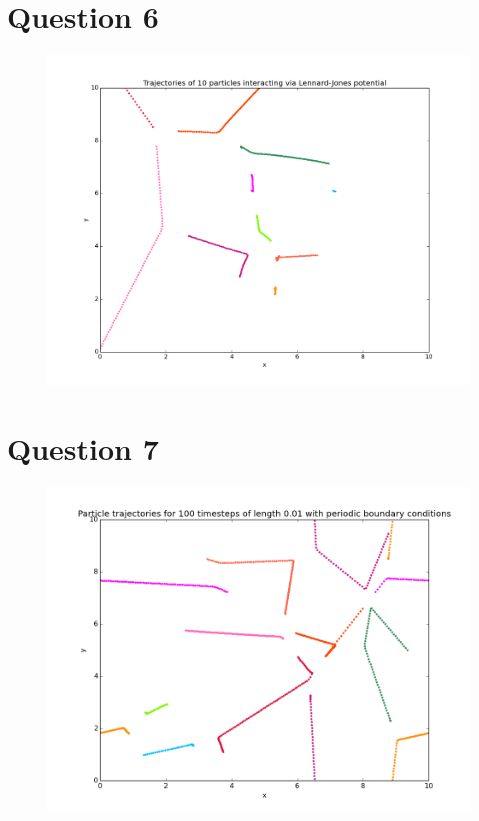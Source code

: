 \documentclass[a4paper,12pt]{article}
\begin{document}
\section{Question 6}

\begin{figure}[H]
\centering
\includegraphics[width = \linewidth]{lab6q6_1.png}
\caption{}
\label{fig:q6}
\end{figure}

\section{Question 7}

\begin{figure}[H]
\centering
\includegraphics[width = \linewidth]{lab6q7.png}
\caption{}
\label{fig:q7}
\end{figure}
\end{document}
